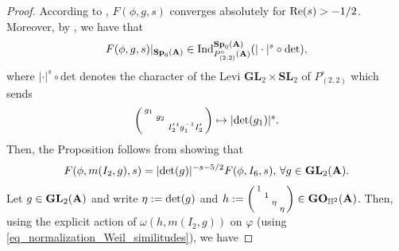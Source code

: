 \documentclass[11pt, reqno]{amsart}
\theoremstyle{plain}
\theoremstyle{definition}
\theoremstyle{remark}
\theoremstyle{plain}
\def\SL{{\mathbf{SL}}}
\def\A{{\bf A}}
\def\Sp{{\mathbf{Sp}}}
\def\GO{{\mathbf{GO}}}
\def\GL{\mathbf{GL}}
\begin{document}
\begin{proof}
    According to \cite[Lemma 5.5.2 (i)]{KudlaRallis}, $F(\phi,g,s)$ converges absolutely for ${\rm Re}(s)>-1/2$.  Moreover, by \cite[(5.5.15)]{KudlaRallis}, we have that 
    \[F(\phi,g,s)|_{\Sp_6(\A)}\in \mathrm{Ind}_{P_{(2,2)}^\circ(\A)}^{\Sp_6(\A)}(|\cdot|^s\circ \mathrm{det}),\]
    where $|\cdot|^s\circ \mathrm{det}$ denotes the character of the Levi $\GL_2 \times \SL_2$ of $P_{(2,2)}^\circ$ which sends $$  \left(\begin{smallmatrix} g_1 &   &  \\ & g_2 &  \\ & &  I_2'{}^t g_1^{-1} I_2' \end{smallmatrix} \right) \mapsto | {\rm det}(g_1)|^s.$$
    Then, the Proposition follows from showing that $$F(\phi,m(I_2,g),s) = | {\rm det}(g)|^{-s -5/2 } F(\phi,I_6,s), \, \forall g \in \GL_2(\A).$$
 Let $g \in \GL_2(\A)$ and write $\eta : = {\rm det}(g)$ and $h := \left(\begin{smallmatrix} 1 & & & \\ & 1 & & \\ & & \eta & \\ & & & \eta \end{smallmatrix}\right) \in \GO_{\mathbb{H}^2}(\A)$. Then, using the explicit action of $\omega(h,m(I_2,g))$ on $\varphi$ (using \eqref{eq_normalization_Weil_similitudes}), we have


\end{proof}
\end{document}
